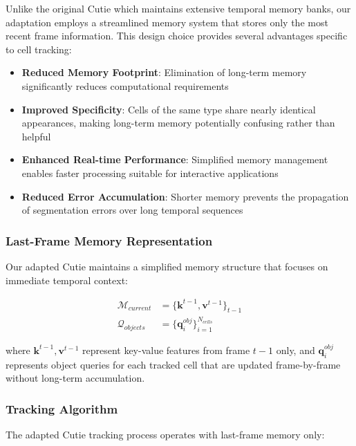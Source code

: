 \documentclass[../cellseek_paper.tex]{subfiles}
\begin{document}
Unlike the original Cutie which maintains extensive temporal memory banks, our adaptation employs a streamlined memory system that stores only the most recent frame information. This design choice provides several advantages specific to cell tracking:

\begin{itemize}
  \item \textbf{Reduced Memory Footprint}: Elimination of long-term memory significantly reduces computational requirements
  \item \textbf{Improved Specificity}: Cells of the same type share nearly identical appearances, making long-term memory potentially confusing rather than helpful
  \item \textbf{Enhanced Real-time Performance}: Simplified memory management enables faster processing suitable for interactive applications
  \item \textbf{Reduced Error Accumulation}: Shorter memory prevents the propagation of segmentation errors over long temporal sequences
\end{itemize}

\subsubsection{Last-Frame Memory Representation}

Our adapted Cutie maintains a simplified memory structure that focuses on immediate temporal context:

\begin{align}
  \mathcal{M}_{current} & = \{\mathbf{k}^{t-1}, \mathbf{v}^{t-1}\}_{t-1} \\
  \mathcal{Q}_{objects} & = \{\mathbf{q}_i^{obj}\}_{i=1}^{N_{cells}}
\end{align}

where $\mathbf{k}^{t-1}, \mathbf{v}^{t-1}$ represent key-value features from frame $t-1$ only, and $\mathbf{q}_i^{obj}$ represents object queries for each tracked cell that are updated frame-by-frame without long-term accumulation.

\subsubsection{Tracking Algorithm}

The adapted Cutie tracking process operates with last-frame memory only:
\end{document}
